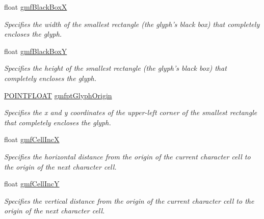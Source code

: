 \begin{DoxyCompactItemize}
\item 
float \hyperlink{struct_tao_1_1_platform_1_1_windows_1_1_gdi_1_1_g_l_y_p_h_m_e_t_r_i_c_s_f_l_o_a_t_a32e06d195b8249225944b0bf5b0cf67b}{gmfBlackBoxX}
\begin{DoxyCompactList}\small\item\em Specifies the width of the smallest rectangle (the glyph's black box) that completely encloses the glyph. \item\end{DoxyCompactList}\item 
float \hyperlink{struct_tao_1_1_platform_1_1_windows_1_1_gdi_1_1_g_l_y_p_h_m_e_t_r_i_c_s_f_l_o_a_t_a934ea63e108f801aae715e3d42a617dd}{gmfBlackBoxY}
\begin{DoxyCompactList}\small\item\em Specifies the height of the smallest rectangle (the glyph's black box) that completely encloses the glyph. \item\end{DoxyCompactList}\item 
\hyperlink{struct_tao_1_1_platform_1_1_windows_1_1_gdi_1_1_p_o_i_n_t_f_l_o_a_t}{POINTFLOAT} \hyperlink{struct_tao_1_1_platform_1_1_windows_1_1_gdi_1_1_g_l_y_p_h_m_e_t_r_i_c_s_f_l_o_a_t_a0def46e14c407a631292afe9da30dbd6}{gmfptGlyphOrigin}
\begin{DoxyCompactList}\small\item\em Specifies the x and y coordinates of the upper-\/left corner of the smallest rectangle that completely encloses the glyph. \item\end{DoxyCompactList}\item 
float \hyperlink{struct_tao_1_1_platform_1_1_windows_1_1_gdi_1_1_g_l_y_p_h_m_e_t_r_i_c_s_f_l_o_a_t_a987aa1f6885a5fa2d4907c570b09f156}{gmfCellIncX}
\begin{DoxyCompactList}\small\item\em Specifies the horizontal distance from the origin of the current character cell to the origin of the next character cell. \item\end{DoxyCompactList}\item 
float \hyperlink{struct_tao_1_1_platform_1_1_windows_1_1_gdi_1_1_g_l_y_p_h_m_e_t_r_i_c_s_f_l_o_a_t_a7170e3044ace825b72567b01c841da43}{gmfCellIncY}
\begin{DoxyCompactList}\small\item\em Specifies the vertical distance from the origin of the current character cell to the origin of the next character cell. \item\end{DoxyCompactList}\end{DoxyCompactItemize}


